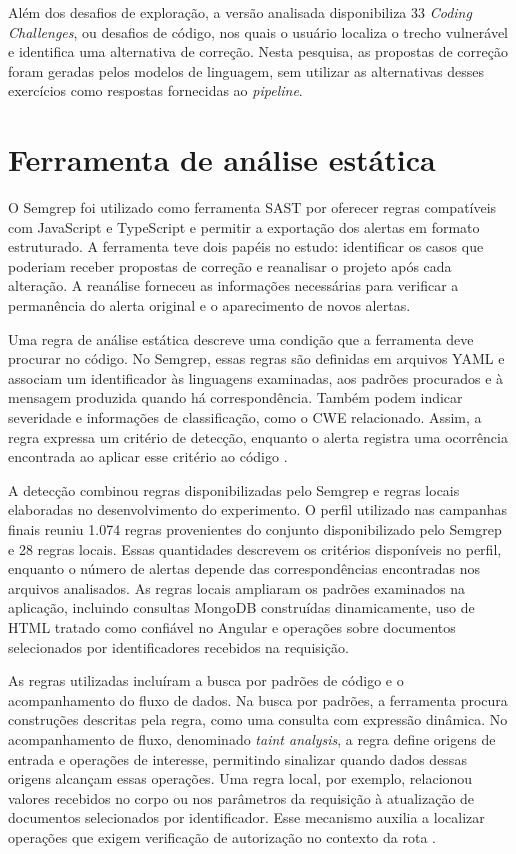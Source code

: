 Além dos desafios de exploração, a versão analisada disponibiliza 33 \textit{Coding Challenges}, ou desafios de código, nos quais o usuário localiza o trecho vulnerável e identifica uma alternativa de correção. Nesta pesquisa, as propostas de correção foram geradas pelos modelos de linguagem, sem utilizar as alternativas desses exercícios como respostas fornecidas ao \textit{pipeline}.

\section{Ferramenta de análise estática}
\label{sec:met-sast}

O Semgrep foi utilizado como ferramenta SAST por oferecer regras compatíveis com JavaScript e TypeScript e permitir a exportação dos alertas em formato estruturado. A ferramenta teve dois papéis no estudo: identificar os casos que poderiam receber propostas de correção e reanalisar o projeto após cada alteração. A reanálise forneceu as informações necessárias para verificar a permanência do alerta original e o aparecimento de novos alertas.

Uma regra de análise estática descreve uma condição que a ferramenta deve procurar no código. No Semgrep, essas regras são definidas em arquivos YAML e associam um identificador às linguagens examinadas, aos padrões procurados e à mensagem produzida quando há correspondência. Também podem indicar severidade e informações de classificação, como o CWE relacionado. Assim, a regra expressa um critério de detecção, enquanto o alerta registra uma ocorrência encontrada ao aplicar esse critério ao código \cite{semgrep_write_rules}.

A detecção combinou regras disponibilizadas pelo Semgrep e regras locais elaboradas no desenvolvimento do experimento. O perfil utilizado nas campanhas finais reuniu 1.074 regras provenientes do conjunto disponibilizado pelo Semgrep e 28 regras locais. Essas quantidades descrevem os critérios disponíveis no perfil, enquanto o número de alertas depende das correspondências encontradas nos arquivos analisados. As regras locais ampliaram os padrões examinados na aplicação, incluindo consultas MongoDB construídas dinamicamente, uso de HTML tratado como confiável no Angular e operações sobre documentos selecionados por identificadores recebidos na requisição.

As regras utilizadas incluíram a busca por padrões de código e o acompanhamento do fluxo de dados. Na busca por padrões, a ferramenta procura construções descritas pela regra, como uma consulta com expressão dinâmica. No acompanhamento de fluxo, denominado \textit{taint analysis}, a regra define origens de entrada e operações de interesse, permitindo sinalizar quando dados dessas origens alcançam essas operações. Uma regra local, por exemplo, relacionou valores recebidos no corpo ou nos parâmetros da requisição à atualização de documentos selecionados por identificador. Esse mecanismo auxilia a localizar operações que exigem verificação de autorização no contexto da rota \cite{semgrep_taint_analysis}.

